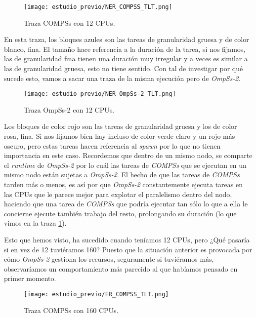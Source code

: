 \begin{figure}[H]
	\centering 
	\caption{Traza COMPSs con 12 CPUs.}
	\texttt{[image: estudio\_previo/NER\_COMPSS\_TLT.png]}
	\label{fig:tltcompss12cpus}
\end{figure}

En esta traza, los bloques azules son las tareas de granularidad gruesa y de color blanco, fina. El tamaño hace referencia a la duración de la tarea, si nos fijamos, las de granularidad fina tienen una duración muy irregular y a veces es similar a las de granularidad gruesa, esto no tiene sentido. Con tal de investigar por qué sucede esto, vamos a sacar una traza de la misma ejecución pero de \textit{OmpSs-2}.

\begin{figure}[H]
	\centering 
	\caption{Traza OmpSs-2 con 12 CPUs.}
	\texttt{[image: estudio\_previo/NER\_OmpSs-2\_TLT.png]}
	\label{fig:tltompss12cpus}
\end{figure}

Los bloques de color rojo son las tareas de granularidad gruesa y los de color rosa, fina. Si nos fijamos bien hay incluso de color verde claro y un rojo más oscuro, pero estas tareas hacen referencia al \textit{spawn} por lo que no tienen importancia en este caso. Recordemos que dentro de un mismo nodo, se comparte el \textit{runtime} de \textit{OmpSs-2} por lo cuál las tareas de \textit{COMPSs} que se ejecutan en un mismo nodo están sujetas a \textit{OmpSs-2}. El hecho de que las tareas de \textit{COMPSs} tarden más o menos, es así por que \textit{OmpSs-2} constantemente ejecuta tareas en las CPUs que le parece mejor para explotar el paralelismo dentro del nodo, haciendo que una tarea de \textit{COMPSs} que podría ejecutar tan sólo lo que a ella le concierne ejecute también trabajo del resto, prolongando su duración (lo que vimos en la traza \ref{fig:tltcompss12cpus}).
\par\bigskip
Esto que hemos visto, ha sucedido cuando teníamos 12 CPUs, pero ¿Qué pasaría si en vez de 12 tuviéramos 160? Puesto que la situación anterior es provocada por cómo \textit{OmpSs-2} gestiona los recursos, seguramente si tuviéramos más, observaríamos un comportamiento más parecido al que habíamos pensado en primer momento.
\par\bigskip

\begin{figure}[H]
	\centering 
	\caption{Traza COMPSs con 160 CPUs.}
	\texttt{[image: estudio\_previo/ER\_COMPSS\_TLT.png]}
	\label{fig:tltcompss160cpus}
\end{figure}

